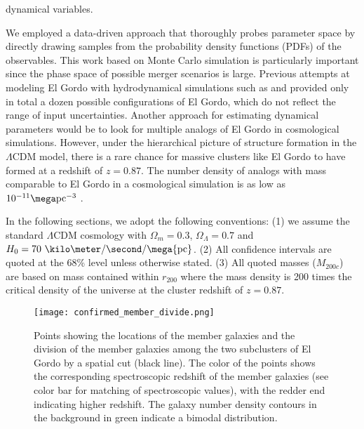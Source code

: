dynamical variables. 
\par 
We employed a data-driven approach that thoroughly probes parameter
space by directly drawing samples from the probability density functions
(PDFs) of
the observables. 
This work based on Monte Carlo simulation is particularly important since
the phase space of possible merger scenarios is large. Previous attempts at modeling El Gordo with hydrodynamical
simulations such as \cite{Donnert13} and \cite{Molnar14} provided only in
total a dozen possible configurations of El Gordo, which do not
reflect the range of input uncertainties. Another approach for
estimating dynamical parameters would be to look for multiple analogs of El Gordo in cosmological
simulations.  However, under the hierarchical picture
of structure formation in the $\Lambda$CDM model, there is a rare chance
for massive clusters like El Gordo to have formed at a redshift of $z = 0.87$.  
The number density of analogs with mass comparable to El Gordo in a
cosmological simulation is as low as $10^{-11} \mega\text{pc}^{-3}$
.\par
In the following sections, we adopt the following conventions: (1) we
assume the standard $\Lambda$CDM cosmology with $\Omega_{m} = 0.3$,
$\Omega_{\Lambda} = 0.7$ and $H_0 = 70~\kilo\meter / \second / \mega
{\rm pc}$. (2) All confidence intervals are quoted at the 68\% level unless otherwise stated. 
(3) All quoted masses ($M_{200c}$) are based on mass contained
within $r_{200}$ where the mass density is 200 times the critical density
of the universe at the cluster redshift of $z = 0.87$. 
\begin{figure}
	\texttt{[image: confirmed\_member\_divide.png]}
	\caption{\label{fig:membership} Points showing the locations of the
	member galaxies and the division of the member galaxies among the two subclusters of El Gordo by a spatial cut
(black line). The color of the points shows the corresponding spectroscopic
redshift of the member galaxies (see color bar for matching of
spectroscopic values), with the redder end indicating higher
redshift. The galaxy number density contours in the background in green indicate a bimodal
distribution.} 
\end{figure}
